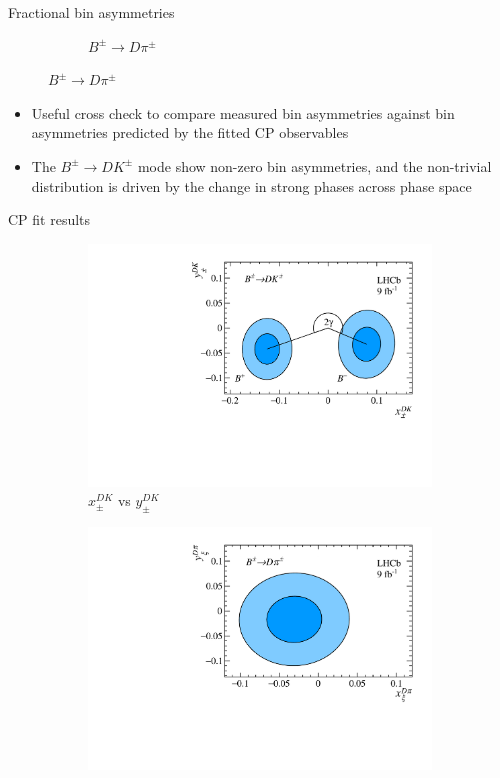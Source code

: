 \documentclass{beamer}
\begin{document}
\begin{frame}{Fractional bin asymmetries}
\begin{figure}
\begin{subfigure}{0.5\textwidth}
      \caption{$B^\pm\to D\pi^\pm$}
    \end{subfigure}
  \end{figure}
  \begin{itemize}
    \item{Useful cross check to compare measured bin asymmetries against bin asymmetries predicted by the fitted CP observables}
    \item{The $B^\pm\to DK^\pm$ mode show non-zero bin asymmetries, and the non-trivial distribution is driven by the change in strong phases across phase space}
  \end{itemize}
\end{frame}

\begin{frame}{CP fit results}
  \begin{figure}
    \centering
    \vspace{-0.2cm}
    \begin{subfigure}{0.5\textwidth}
      \includegraphics[width = 1.0\textwidth]{Plots/B2DK_CP_Observables_Contours.pdf}
      \caption{$x_\pm^{DK}$ vs $y_\pm^{DK}$}
    \end{subfigure}%
    \begin{subfigure}{0.5\textwidth}
      \includegraphics[width = 1.0\textwidth]{Plots/B2Dpi_CP_Observables_Contours.pdf}

\end{subfigure}
\end{figure}
\end{frame}
\end{document}

